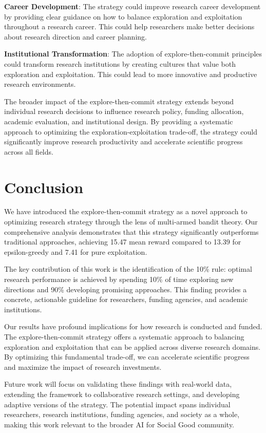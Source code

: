 \documentclass[letterpaper]{article} %
\begin{document}
\textbf{Career Development}: The strategy could improve research career development by providing clear guidance on how to balance exploration and exploitation throughout a research career. This could help researchers make better decisions about research direction and career planning.

\textbf{Institutional Transformation}: The adoption of explore-then-commit principles could transform research institutions by creating cultures that value both exploration and exploitation. This could lead to more innovative and productive research environments.

The broader impact of the explore-then-commit strategy extends beyond individual research decisions to influence research policy, funding allocation, academic evaluation, and institutional design. By providing a systematic approach to optimizing the exploration-exploitation trade-off, the strategy could significantly improve research productivity and accelerate scientific progress across all fields.

\section{Conclusion}

We have introduced the explore-then-commit strategy as a novel approach to optimizing research strategy through the lens of multi-armed bandit theory. Our comprehensive analysis demonstrates that this strategy significantly outperforms traditional approaches, achieving 15.47 mean reward compared to 13.39 for epsilon-greedy and 7.41 for pure exploitation.

The key contribution of this work is the identification of the 10\% rule: optimal research performance is achieved by spending 10\% of time exploring new directions and 90\% developing promising approaches. This finding provides a concrete, actionable guideline for researchers, funding agencies, and academic institutions.

Our results have profound implications for how research is conducted and funded. The explore-then-commit strategy offers a systematic approach to balancing exploration and exploitation that can be applied across diverse research domains. By optimizing this fundamental trade-off, we can accelerate scientific progress and maximize the impact of research investments.

Future work will focus on validating these findings with real-world data, extending the framework to collaborative research settings, and developing adaptive versions of the strategy. The potential impact spans individual researchers, research institutions, funding agencies, and society as a whole, making this work relevant to the broader AI for Social Good community.
\end{document}
